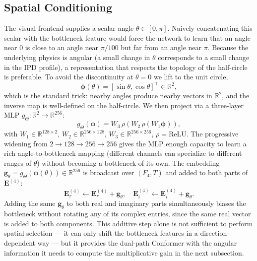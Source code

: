 \documentclass[journal,10pt]{IEEEtran}
\newcommand{\R}{\mathbb{R}}
\newcommand{\bE}{\mathbf{E}}
\newcommand{\bg}{\mathbf{g}}
\newcommand{\bphi}{\boldsymbol{\phi}}
\begin{document}
\subsection{Spatial Conditioning}
The visual frontend supplies a scalar angle \(\theta\in[0,\pi]\). Naively concatenating this scalar with the bottleneck feature would force the network to learn that an angle near \(0\) is close to an angle near \(\pi/100\) but far from an angle near \(\pi\). Because the underlying physics is angular (a small change in \(\theta\) corresponds to a small change in the IPD profile), a representation that respects the topology of the half-circle is preferable. To avoid the discontinuity at \(\theta=0\) we lift to the unit circle,
\begin{equation}
\bphi(\theta)=[\sin\theta,\cos\theta]^\top\in\R^2,
\end{equation}
which is the standard trick: nearby angles produce nearby vectors in \(\R^2\), and the inverse map is well-defined on the half-circle. We then project via a three-layer MLP \(g_\Theta:\R^2\!\to\!\R^{256}\):
\begin{equation}
g_\Theta(\bphi)=W_3\,\rho(W_2\,\rho(W_1\bphi)),
\label{eq:angle_mlp}
\end{equation}
with \(W_1\!\in\!\R^{128\times 2},\,W_2\!\in\!\R^{256\times 128},\,W_3\!\in\!\R^{256\times 256}\), \(\rho=\mathrm{ReLU}\). The progressive widening from \(2\to 128\to 256\to 256\) gives the MLP enough capacity to learn a rich angle-to-bottleneck mapping (different channels can specialize to different ranges of \(\theta\)) without becoming a bottleneck of its own. The embedding \(\bg_\theta=g_\Theta(\bphi(\theta))\!\in\!\R^{256}\) is broadcast over \((F_4,T)\) and added to both parts of \(\bE^{(4)}\):
\begin{equation}
\bE^{(4)}_r\!\leftarrow\!\bE^{(4)}_r\!+\!\bg_\theta,\quad \bE^{(4)}_i\!\leftarrow\!\bE^{(4)}_i\!+\!\bg_\theta.
\label{eq:angle_add}
\end{equation}
Adding the same \(\bg_\theta\) to both real and imaginary parts simultaneously biases the bottleneck without rotating any of its complex entries, since the same real vector is added to both components. This additive step alone is not sufficient to perform spatial selection --- it can only shift the bottleneck features in a direction-dependent way --- but it provides the dual-path Conformer with the angular information it needs to compute the multiplicative gain in the next subsection.
\end{document}
